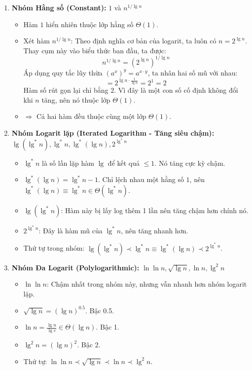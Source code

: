 \documentclass[12pt,a4paper]{article}
\begin{document}
\begin{enumerate}[label=\textbf{\arabic*.}]

    \item \textbf{Nhóm Hằng số (Constant):} $1$ và $n^{1/\lg n}$
    \begin{itemize}
        \item Hàm $1$ hiển nhiên thuộc lớp hằng số $\Theta(1)$.
        \item Xét hàm $n^{1/\lg n}$: Theo định nghĩa cơ bản của logarit, ta luôn có $n = 2^{\lg n}$. Thay cụm này vào biểu thức ban đầu, ta được:
        \[
        n^{1/\lg n} = \left(2^{\lg n}\right)^{1/\lg n}
        \]
        Áp dụng quy tắc lũy thừa $(a^x)^y = a^{x \cdot y}$, ta nhân hai số mũ với nhau:
        \[
        = 2^{\lg n \cdot \frac{1}{\lg n}} = 2^1 = 2
        \]
        Hàm số rút gọn lại chỉ bằng $2$. Vì đây là một con số cố định không đổi khi $n$ tăng, nên nó thuộc lớp $\Theta(1)$.
        \item $\Longrightarrow$ Cả hai hàm đều thuộc cùng một lớp $\Theta(1)$.
    \end{itemize}

    \item \textbf{Nhóm Logarit lặp (Iterated Logarithm - Tăng siêu chậm):} $\lg(\lg^* n), \lg^* n, \lg^*(\lg n), 2^{\lg^* n}$
    \begin{itemize}[noitemsep]
        \item $\lg^* n$ là số lần lặp hàm $\lg$ để kết quả $\leq 1$. Nó tăng cực kỳ chậm.
        \item $\lg^*(\lg n) = \lg^* n - 1$. Chỉ lệch nhau một hằng số $1$, nên $\lg^*(\lg n) \equiv \lg^* n \in \Theta(\lg^* n)$.
        \item $\lg(\lg^* n)$: Hàm này bị lấy log thêm 1 lần nên tăng chậm hơn chính nó.
        \item $2^{\lg^* n}$: Đây là hàm mũ của $\lg^* n$, nên tăng nhanh hơn.
        \item Thứ tự trong nhóm: $\lg(\lg^* n) \prec \lg^* n \equiv \lg^*(\lg n) \prec 2^{\lg^* n}$.
    \end{itemize}

    \item \textbf{Nhóm Đa Logarit (Polylogarithmic):} $\ln\ln n, \sqrt{\lg n}, \ln n, \lg^2 n$
    \begin{itemize}[noitemsep]
        \item $\ln\ln n$: Chậm nhất trong nhóm này, nhưng vẫn nhanh hơn nhóm logarit lặp.
        \item $\sqrt{\lg n} = (\lg n)^{0.5}$. Bậc 0.5.
        \item $\ln n = \frac{\lg n}{\lg e} \in \Theta(\lg n)$. Bậc 1.
        \item $\lg^2 n = (\lg n)^2$. Bậc 2.
        \item Thứ tự: $\ln \ln n \prec \sqrt{\lg n} \prec \ln n \prec \lg^2 n$.
    \end{itemize}


\end{enumerate}
\end{document}
